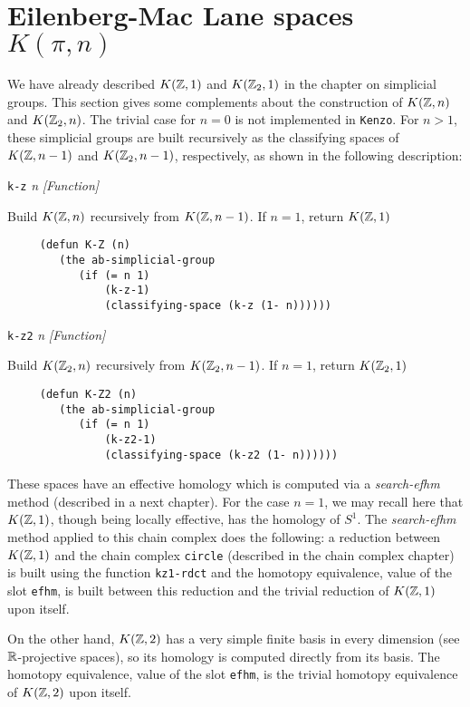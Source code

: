 \section {Eilenberg-Mac Lane spaces $K(\pi,n)$}

We have already described $K({\mathbb{Z}},1)$ and $K({\mathbb{Z}}_2,1)$ in the chapter on simplicial groups.
This section gives some complements about the construction of $K({\mathbb{Z}},n)$ and $K({\mathbb{Z}}_2,n)$. The trivial case
for $n=0$ is not implemented in {\tt Kenzo}. For $n > 1$, these simplicial groups
are built recursively as the classifying spaces of $K({\mathbb{Z}},n-1)$ and $K({\mathbb{Z}}_2,n-1)$, respectively, as shown
in the following description:
\par
\vskip 0.40cm
{\parindent=0mm
{\leftskip=5mm
{\tt k-z} {\em n} \hfill {\em [Function]} \par}
{\leftskip=15mm
Build $K({\mathbb{Z}},n)$ recursively from $K({\mathbb{Z}},n-1)$. If $n=1$, return $K({\mathbb{Z}},1)$
{\footnotesize\begin{verbatim}
     (defun K-Z (n)
        (the ab-simplicial-group
           (if (= n 1)
               (k-z-1)
               (classifying-space (k-z (1- n))))))
\end{verbatim}}
\par}
{\leftskip=5mm
{\tt k-z2} {\em n} \hfill {\em [Function]} \par}
{\leftskip=15mm
Build $K({\mathbb{Z}}_2,n)$ recursively from $K({\mathbb{Z}}_2,n-1)$. If $n=1$, return $K({\mathbb{Z}}_2,1)$
{\footnotesize\begin{verbatim}
     (defun K-Z2 (n)
        (the ab-simplicial-group
           (if (= n 1)
               (k-z2-1)
               (classifying-space (k-z2 (1- n))))))
\end{verbatim}}
\par}}
These spaces have an effective homology which is computed via a {\em search-efhm} method (described in a next chapter).
For the case $n=1$, we may recall here that $K({\mathbb{Z}},1)$, though being locally effective,
has the homology of $S^1$. The  {\em search-efhm} method applied to this chain complex does the following:  a reduction
between $K({\mathbb{Z}},1)$ and the chain complex {\tt circle} (described in the chain complex chapter) is
built using the function {\tt kz1-rdct} and the homotopy equivalence, value of the slot {\tt efhm}, is
built between this reduction and the trivial reduction of $K({\mathbb{Z}},1)$ upon itself.\par
On the other hand, $K({\mathbb{Z}},2)$ has a very simple finite basis in every dimension (see ${\mathbb{R}}$-projective
spaces), so its homology is computed directly from its basis. The  homotopy
equivalence, value of the slot {\tt efhm}, is the trivial homotopy equivalence of $K({\mathbb{Z}},2)$ upon
itself.
\newpage

